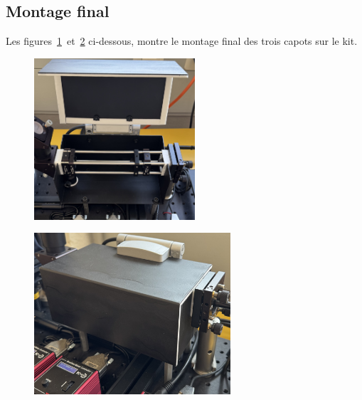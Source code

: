 \begin{minipage}{\textwidth}
    \subsection{Montage final}
    Les figures~\ref{montage_alu_ouvert}~et~\ref{montage_alu_ferme} ci-dessous, montre le montage final des trois capots sur le kit.
    \vspace{1em}

    \begin{minipage}[c]{0.48\textwidth}
        \begin{figure}[H]
            \begin{center}
                \includegraphics[height=6cm]{assets/figures/Protections_laser/Securite_mecanique/Protection_entree_laser/montage_alu_ouvert.jpeg}
            \end{center}
            \label{montage_alu_ouvert}
        \end{figure}
    \end{minipage}
    \begin{minipage}[c]{0.48\textwidth}
        \begin{figure}[H]
            \begin{center}
                \includegraphics[height=6cm]{assets/figures/Protections_laser/Securite_mecanique/Protection_entree_laser/montage_alu_ferme.jpeg}
            \end{center}
            \label{montage_alu_ferme}
        \end{figure}
    \end{minipage}
\end{minipage}

